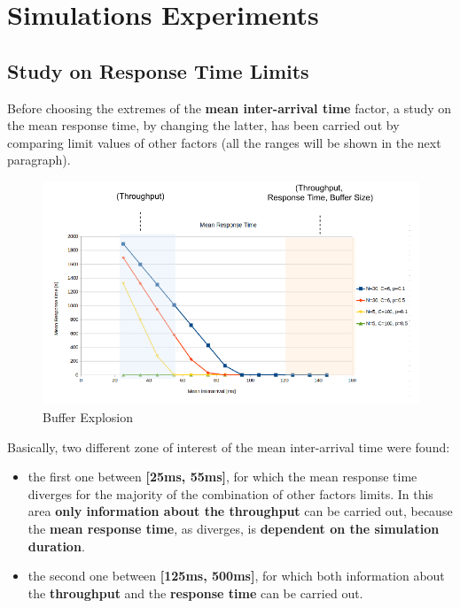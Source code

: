 \section{Simulations Experiments}
\subsection{Study on Response Time Limits}
Before choosing the extremes of the \textbf{mean inter-arrival time} factor, a study on the mean response time, by changing the latter, has been carried out by comparing limit values of other factors (all the ranges will be shown in the next paragraph).  
 \begin{figure}[H]
 	\centering
 	\includegraphics[width=\textwidth]{img/BufferExplosion.pdf}
 	\caption{Buffer Explosion}
 	\label {img: warmUp}
 \end{figure}
\noindent Basically, two different zone of interest of the mean inter-arrival time were found: 
\begin{itemize}
	\item the first one between \textbf{[25ms, 55ms]}, for which the mean response time diverges for the majority of the combination of other factors limits. In this area \textbf{only information about the throughput} can be carried out, because the \textbf{mean response time}, as diverges, is \textbf{dependent on the simulation duration}.
	\item the second one between \textbf{[125ms, 500ms]}, for which both information about the \textbf{throughput} and the \textbf{response time} can be carried out.
	
\end{itemize}

